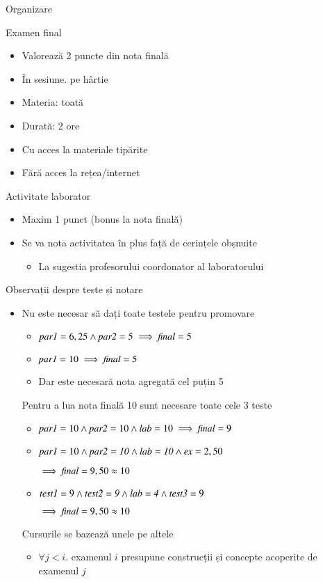 \documentclass[xcolor=pdftex,romanian,colorlinks]{beamer}
\begin{document}
\begin{section}{Organizare}
\begin{frame}{Examen final}
\begin{itemize}
\item Valorează 2 puncte din nota finală
\item În sesiune. pe hârtie
\item Materia: toată
\item Durată: 2 ore
\item Cu acces la materiale tipărite
\item Fără acces la rețea/internet
\end{itemize}
\end{frame}

\begin{frame}{Activitate laborator}
\begin{itemize}
\item Maxim 1 punct (bonus la nota finală)
\item Se va nota activitatea în plus față de cerințele obșnuite
\begin{itemize}
\item La sugestia profesorului coordonator al laboratorului
\end{itemize}
\end{itemize}
\end{frame}

\begin{frame}{Observații despre teste și notare}
\begin{itemize}
\item Nu este necesar să dați toate testele pentru promovare
\begin{itemize}
\item ${\it par1} = 6,25 \wedge {\it par2} =  5 \implies {\it final} = 5$ 
\item ${\it par1} = 10 \implies {\it final} = 5$ 
\item Dar este necesară nota agregată cel puțin 5
\end{itemize}
\vitem Pentru a lua nota finală 10 sunt necesare toate cele 3 teste
\begin{itemize}
\item ${\it par1} = 10 \wedge {\it par2} =  10 \wedge {\it lab} =  10 \implies {\it final} = 9$ 
\item ${\it par1} = 10 \wedge {\it par2 =  10} \wedge {\it lab =  10} \wedge {\it ex} = 2,50$

\hfill $ \implies {\it final} = 9,50\approx 10$
\item ${\it test1} = 9 \wedge {\it test2 =  9} \wedge {\it lab =  4} \wedge {\it test3} = 9$

\hfill $ \implies {\it final} = 9,50\approx 10$
\end{itemize}
\vitem Cursurile se bazează unele pe altele
\begin{itemize}
\item $\forall j < i . $ examenul $i$ presupune construcții și concepte acoperite de examenul $j$
\end{itemize}
\end{itemize}
\end{frame}


\end{section}
\end{document}
